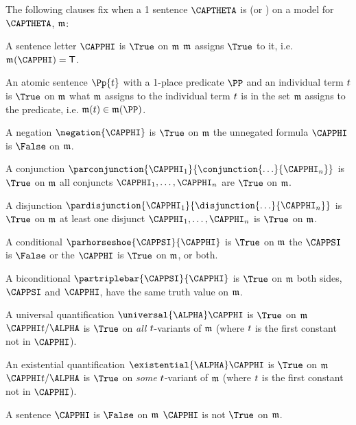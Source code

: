 \begin{majorILnc}{}
The following clauses fix when a \GQL{}1 sentence $\CAPTHETA$ is \nidf{$\True$} (or \nidf{$\False$}) on a model for $\CAPTHETA$, $\mathfrak{m}$:
\begin{cenumerate}
\item A sentence letter $\CAPPHI$ is $\True$ on $\mathfrak{m}$ \Iff $\mathfrak{m^{\mathrm{}}_{\mathrm{}}}$ assigns $\True$ to it, i.e. \Iff $\As{}{}(\CAPPHI)=\TrueB$.
\item An atomic sentence $\Pp{\variable{t}}$ with a 1-place predicate $\PP$ and an individual term $t$ is $\True$ on $\mathfrak{m}$ \Iff what $\mathfrak{m}$ assigns to the individual term $t$ is in the set $\mathfrak{m}$ assigns to the predicate, i.e. \Iff $\IntA(\variable{t})\in\IntA(\PP)$.
\item A negation $\negation{\CAPPHI}$ is $\True$ on $\mathfrak{m}$ \Iff the unnegated formula $\CAPPHI$ is $\False$ on $\mathfrak{m}$.
\item A conjunction $\parconjunction{\CAPPHI_1}{\conjunction{\ldots}{\CAPPHI_{\integer{n}}}}$ is $\True$ on $\mathfrak{m}$ \Iff all conjuncts $\CAPPHI_1,\ldots,\CAPPHI_{\integer{n}}$ are $\True$ on $\mathfrak{m}$.
\item A disjunction $\pardisjunction{\CAPPHI_1}{\disjunction{\ldots}{\CAPPHI_{\integer{n}}}}$ is $\True$ on $\mathfrak{m}$ \Iff at least one disjunct $\CAPPHI_1,\ldots,\CAPPHI_{\integer{n}}$ is $\True$ on $\mathfrak{m}$.
\item A conditional $\parhorseshoe{\CAPPSI}{\CAPPHI}$ is $\True$ on $\mathfrak{m}$ \Iff the  $\CAPPSI$ is $\False$ or the  $\CAPPHI$ is $\True$ on $\mathfrak{m}$, or both.
\item A biconditional $\partriplebar{\CAPPSI}{\CAPPHI}$ is $\True$ on $\mathfrak{m}$ \Iff both sides, $\CAPPSI$ and $\CAPPHI$, have the same truth value on $\mathfrak{m}$.
\item\label{GQL1TruthUnvQuant} A universal quantification $\universal{\ALPHA}\CAPPHI$ is $\True$ on $\mathfrak{m}$ \Iff $\CAPPHI\variable{t}/\ALPHA$ is $\True$ on \emph{all} $t$-variants of $\mathfrak{m}$ (where $t$ is the first constant not in $\CAPPHI$).
\item An existential quantification $\existential{\ALPHA}\CAPPHI$ is $\True$ on $\mathfrak{m}$ \Iff $\CAPPHI\variable{t}/\ALPHA$ is $\True$ on \emph{some} $t$-variant of $\mathfrak{m}$ (where $t$ is the first constant not in $\CAPPHI$).
\item A sentence $\CAPPHI$ is $\False$ on $\mathfrak{m}$ \Iff $\CAPPHI$ is not $\True$ on $\mathfrak{m}$.
\end{cenumerate}
\end{majorILnc}

